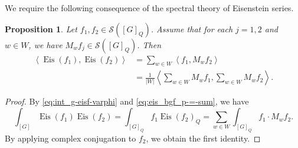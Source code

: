 \documentclass[reqno]{amsart}
\DeclareMathOperator{\Eis}{Eis}
\theoremstyle{plain} \newtheorem{theorem} {Theorem}
\newtheorem{proposition} [theorem] {Proposition}
\theoremstyle{definition} \newtheorem{definition} [theorem] {Definition}
\theoremstyle{itplain} %
\numberwithin{equation}{section}
\numberwithin{theorem}{section}
\begin{document}
We require the following consequence of the spectral theory of Eisenstein series.
\begin{proposition}\label{lem:let-f_1-f_2}
  Let $f_1, f_2 \in \mathcal{S}([G]_Q)$.  Assume that for each $j=1,2$ and $w \in W$, we have $M_w f_j \in \mathcal{S}([G]_Q)$.  Then
  \begin{align*}
  \left\langle \Eis(f_1), \Eis(f_2) \right\rangle
    &= \sum_{w \in W}
  \left\langle f_1, M_w f_2 \right\rangle \\
    &=
      \frac{1}{|W|}
  \left\langle \sum _{w \in W} M_w f_1, \sum _{w \in W } M_w f_2 \right\rangle.
  \end{align*}
\end{proposition}
\begin{proof}
  By \eqref{eq:int_g-eisf-varphi} and \eqref{eq:eis_bgf_p-=-sum}, we have
  \begin{equation*}
    \int _{[G]} \Eis(f_1) \Eis(f_2)
    =
    \int _{[G]_Q} f_1 \Eis(f_2)_Q
    = \sum _{w \in W}
    \int _{[G]_Q} f_1 \cdot  M_w f_2.
  \end{equation*}
  By applying complex conjugation to $f_2$, we obtain the first identity.


\end{proof}
\end{document}
